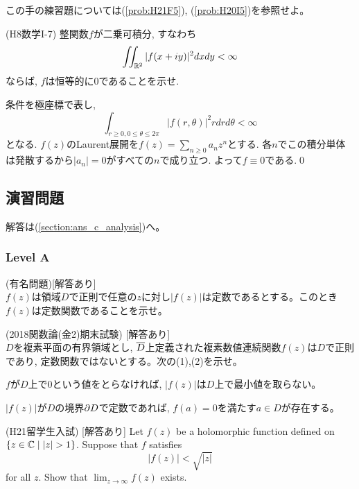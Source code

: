 この手の練習題については(\ref{prob:H21F5}), (\ref{prob:H20I5})を参照せよ。


\begin{egprob} (H8数学I-7)
整関数$f$が二乗可積分, すなわち
\[\iint_{\mathbb{R}^2} |f(x+iy)|^2dxdy < \infty\]
ならば, $f$は恒等的に0であることを示せ.
\end{egprob}
\begin{egans}
条件を極座標で表し,
\[\int_{r\geq 0, 0\leq \theta\leq 2\pi} |f(r,\theta)|^2rdrd\theta < \infty\]
となる. $f(z)$のLaurent展開を$f(z) = \sum_{n\geq 0} a_nz^n$とする.
各$n$でこの積分単体は発散するから$|a_n| = 0$がすべての$n$で成り立つ. よって$f\equiv 0$である.\qed
\end{egans}




\newpage
\subsection{演習問題}
解答は(\ref{section:ans_c_analysis})へ。

\subsubsection{Level A}
\begin{prob} (有名問題)[解答あり]\\
$f(z)$は領域$D$で正則で任意の$z$に対し$|f(z)|$は定数であるとする。このとき$f(z)$は定数関数であることを示せ。
\end{prob}

\begin{prob}(2018関数論(金2)期末試験) [解答あり]\\
$D$を複素平面の有界領域とし, $\overline{D}$上定義された複素数値連続関数$f(z)$は$D$で正則であり, 定数関数ではないとする。次の(1),(2)を示せ。
\ben
\item $f$が$D$上で$0$という値をとらなければ, $|f(z)|$は$D$上で最小値を取らない。
\item $|f(z)|$が$D$の境界$\partial D$で定数であれば, $f(a) = 0$を満たす$a\in D$が存在する。
\een
\end{prob}

\begin{prob} (H21留学生入試) [解答あり] \label{prob:H21F5}
Let $f(z)$ be a holomorphic function defined on $\{ z\in \mb{C} \mid |z|>1\}$. Suppose that $f$ satisfies
\[|f(z)| < \sqrt{|z|}\]
for all $z$.  Show that $\lim_{z\to \infty} f(z)$ exists.
\end{prob}
